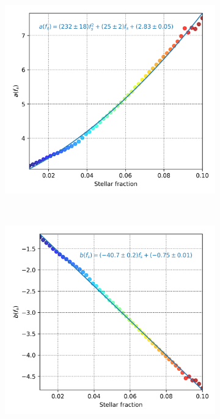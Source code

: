 		\begin{figure}[h]
			\centering
			\begin{subfigure}[t]{0.4\textwidth}
				\includegraphics[width = \textwidth]{"../Files/Week 10/a"}
				\caption{}
			\end{subfigure}
			~ 
			\begin{subfigure}[t]{0.4\textwidth}
				\includegraphics[width=\textwidth]{"../Files/Week 10/b"}

\end{subfigure}
\end{figure}
